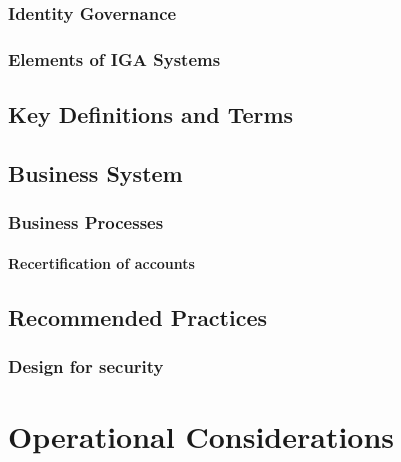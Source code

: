 \hypertarget{identity-governance}{%
\subsection{Identity Governance }\label{identity-governance}}

\hypertarget{elements-of-iga-systems}{%
\subsection{Elements of IGA Systems }\label{elements-of-iga-systems}}

\hypertarget{key-definitions-and-terms}{%
\section{Key Definitions and Terms
}\label{key-definitions-and-terms}}

\hypertarget{business-system}{%
\section{Business System}\label{business-system}}

\hypertarget{business-processes}{%
\subsection{Business Processes}\label{business-processes}}

\hypertarget{recertification-of-accounts}{%
\subsubsection{Recertification of
accounts}\label{recertification-of-accounts}}

\hypertarget{recommended-practices}{%
\section{Recommended Practices}\label{recommended-practices}}

\hypertarget{design-for-security}{%
\subsection{Design for security}\label{design-for-security}}

\hypertarget{operational-considerations}{%
\chapter{Operational Considerations}\label{operational-considerations}}

